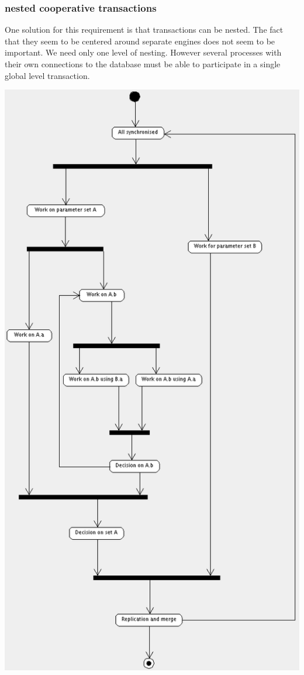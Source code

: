 \documentclass[]{lofar}
\begin{document}
   

\subsubsection{nested cooperative transactions}
\label{id2719612}\hypertarget{id2719612}{}%



     One solution for this requirement is that transactions can be
     nested. The fact that they seem to be centered around separate
     engines does not seem to be important. We need only one level of
     nesting. However several processes with their own connections to
     the database must be able to participate in a single global level
     transaction.

    
{{\includegraphics[]{database.png}}}
\end{document}
